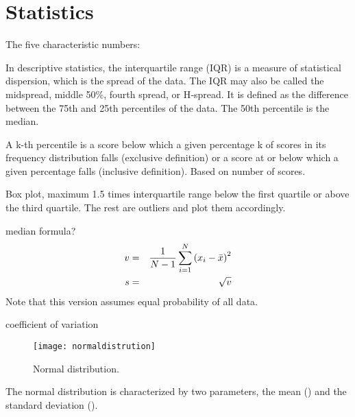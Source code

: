 	\chapter{Statistics}

The five characteristic numbers:
	\begin{plainlist}
		\item \xsmallest{}
		\item \quartileone{}
		\item \quartiletwo{}
		\item \quartilethree{}
		\item \xlargest{}
	\end{plainlist}

In descriptive statistics, the interquartile range (IQR) is a measure of statistical dispersion, which is the spread of the data.  The IQR may also be called the midspread, middle 50\%, fourth spread, or H‑spread.  It is defined as the difference between the 75th and 25th percentiles of the data.  The 50th percentile is the median.

A k-th percentile is a score below which a given percentage k of scores in its frequency distribution falls (exclusive definition) or a score at or below which a given percentage falls (inclusive definition).  Based on number of scores.

Box plot, maximum 1.5 times interquartile range below the first quartile or above the third quartile.  The rest are outliers and plot them accordingly.



median formula?
	\begin{eqnarray}
		\mbox{$v$} 					& = & \frac{1}{N-1}\sum^N_{i=1}\left(x_i - \mbox{$\bar{x}$}\right)^2 \\
		\mbox{$s$}	& = & \sqrt{\mbox{$v$}}
	\end{eqnarray}
Note that this version assumes equal probability of all data.



coefficient of variation

	\begin{figure}[tbp]
		\centering
		\texttt{[image: normaldistrution]}
		\caption[Normal distribution]{Normal distribution.}
		\label{fig:normaldistrution}
	\end{figure}

The normal distribution is characterized by two parameters, the mean (\populationmean) and the standard deviation (\populationstandarddeviation).

